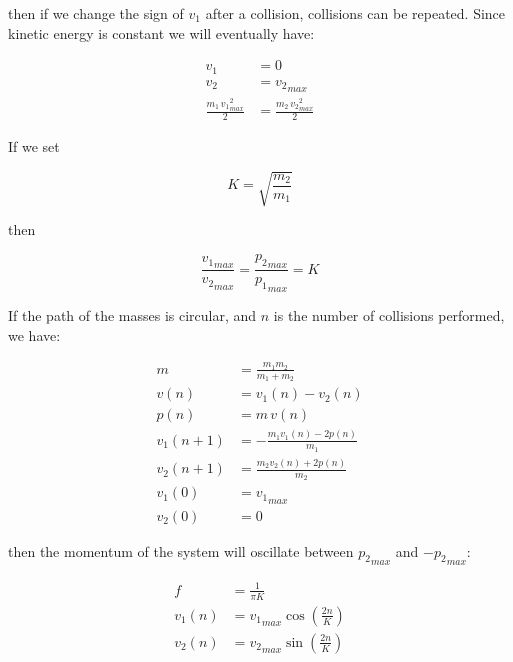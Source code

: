 \documentclass[]{elementary-physics}
\begin{document}
then if we change the sign of $v_1$ after a collision, collisions can be repeated.
Since kinetic energy is constant we will eventually have:

\begin{subequations}
\begin{align}
v_1 &= 0 \\
v_2 &= {v_2}_{max} \\
\frac{m_1 \, {v_1}_{max}^2}{2} &= \frac{m_2 \, {v_2}_{max}^2}{2}
\end{align}
\end{subequations}

If we set

\begin{equation}
K = \sqrt{\frac{m_2}{m_1}}
\end{equation}

then

\begin{equation}
\frac{{v_1}_{max}}{{v_2}_{max}} = \frac{{p_2}_{max}}{{p_1}_{max}} = K
\end{equation}

If the path of the masses is circular, and $n$ is the number of collisions performed, we have:

\begin{subequations}
\begin{align}
m &= \frac{m_1 m_2}{m_1 + m_2} \\
v(n) &= v_1(n) - v_2(n) \\
p(n) &= m \, v(n) \\
v_1(n+1) &= -\frac{m_1 v_1(n) - 2p(n)}{m_1} \\
v_2(n+1) &= \frac{m_2 v_2(n) + 2p(n)}{m_2} \\
v_1(0) &= {v_1}_{max} \\
v_2(0) &= 0
\end{align}
\end{subequations}

then the momentum of the system will oscillate between ${p_2}_{max}$ and $-{p_2}_{max}$:

\begin{subequations}
\begin{align}
f &= \frac{1}{\pi K} \\
v_1(n) &= {v_1}_{max} \cos (\frac{2n}{K}) \\
v_2(n) &= {v_2}_{max} \sin (\frac{2n}{K})
\end{align}
\end{subequations}
\end{document}
